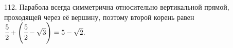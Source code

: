 112. Парабола всегда симметрична относительно вертикальной прямой, проходящей через её вершину, поэтому второй корень равен $\cfrac{5}{2}+\left(\cfrac{5}{2}-\sqrt{3}\right)=5-\sqrt{2}.$\\

